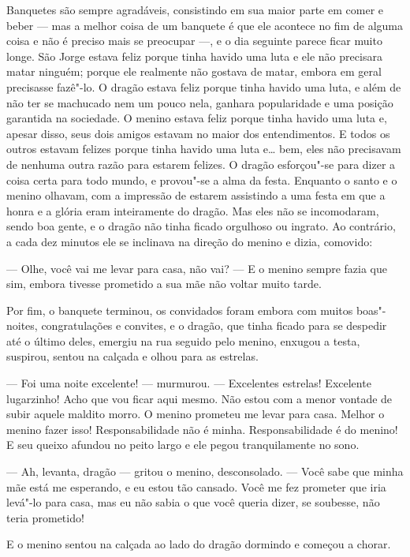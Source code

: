 Banquetes são sempre agradáveis, consistindo em sua maior parte em
comer e beber --- mas a melhor coisa de um banquete é que ele acontece
no fim de alguma coisa e não é preciso mais se preocupar ---, e o dia
seguinte parece ficar muito longe. São Jorge estava feliz porque
tinha havido uma luta e ele não precisara matar ninguém; porque ele
realmente não gostava de matar, embora em geral precisasse fazê"-lo.
O dragão estava feliz porque tinha havido uma luta, e além de não ter
se machucado nem um pouco nela, ganhara popularidade e uma posição
garantida na sociedade. O menino estava feliz porque tinha havido uma
luta e, apesar disso, seus dois amigos estavam no maior dos
entendimentos. E todos os outros estavam felizes porque tinha havido
uma luta e\ldots{} bem, eles não precisavam de nenhuma outra razão para
estarem felizes. O dragão esforçou"-se para dizer a coisa certa para
todo mundo, e provou"-se a alma da festa. Enquanto o santo e o menino		
olhavam, com a impressão de estarem assistindo a uma festa em que a
honra e a glória eram inteiramente do dragão. Mas eles não se
incomodaram, sendo boa gente, e o dragão não tinha ficado orgulhoso
ou ingrato. Ao contrário, a cada dez minutos ele se inclinava na
direção do menino e dizia, comovido:

--- Olhe, você vai me levar para casa, não vai? --- E o menino sempre
fazia que sim, embora tivesse prometido a sua mãe não voltar muito
tarde.

Por fim, o banquete terminou, os convidados foram embora com muitos
boas"-noites, congratulações e convites, e o dragão, que tinha ficado
para se despedir até o último deles, emergiu na rua seguido pelo
menino, enxugou a testa, suspirou, sentou na calçada e olhou para as
estrelas.

--- Foi uma noite excelente! --- murmurou. --- Excelentes estrelas!
Excelente lugarzinho! Acho que vou ficar aqui mesmo. Não estou com a
menor vontade de subir aquele maldito morro. O menino prometeu me
levar para casa. Melhor o menino fazer isso! Responsabilidade não é
minha. Responsabilidade é do menino! E seu queixo afundou no peito 
largo e ele pegou tranquilamente no sono.

--- Ah, levanta, dragão --- gritou o menino, desconsolado. --- Você sabe
que minha mãe está me esperando, e eu estou tão cansado. Você me fez
prometer que iria levá"-lo para casa, mas eu não sabia o que você
queria dizer, se soubesse, não teria prometido! 

E o menino sentou na calçada ao lado do dragão dormindo e começou a
chorar.

